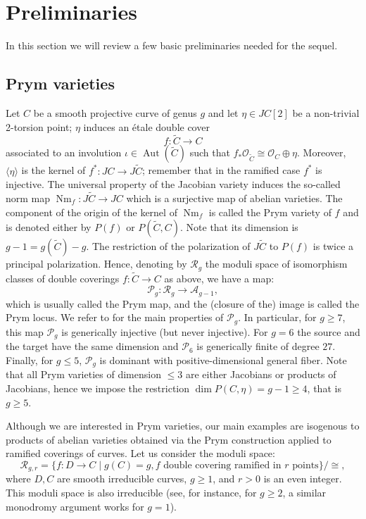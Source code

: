 \documentclass[preprint,12pt]{amsart}
\def\cA{\ensuremath{\mathcal{A}}}
\def\cP{\ensuremath{\mathcal{P}}}
\def\cR{\ensuremath{\mathcal{R}}}
\def\tC{\ensuremath{\tilde{C}}}
\DeclareMathOperator{\Aut}{Aut}
\DeclareMathOperator{\Nm}{Nm}
\theoremstyle{plain}
\theoremstyle{definition}
\begin{document}
\section{Preliminaries}
In this section we will review a few basic preliminaries needed for the sequel.

\subsection{Prym varieties}\label{subsec:PrymVar} Let $C$ be a smooth projective curve of genus $g$ and let $\eta\in JC[2]$ be a non-trivial 2-torsion point; $\eta$ induces an \'etale double cover 
\[f:\tC\to C\]
associated to an involution $\iota\in\Aut(\tC)$ such that $f_*\mathcal{O}_{\tC}\cong\mathcal{O}_C\oplus\eta.$ Moreover, $\langle \eta \rangle$ is the kernel of $f^* : JC \rightarrow J\tC $; remember that in the ramified case $f^*$ is injective.
The universal property of the Jacobian variety induces the so-called norm map $\Nm_f:J\tC \rightarrow JC$ which is a surjective map of abelian varieties.
The component of the origin of the kernel of $\Nm_f$ is called the Prym variety of $f$ and is denoted either by $P(f)$ or $P(\tC,C)$.
Note that its dimension is $g-1=g(\tC)-g$.
The restriction of the polarization of $J\tC$ to $P(f)$ is twice a principal polarization.
Hence, denoting by $\cR_g$ the moduli space of isomorphism classes of double coverings $f:\tC\rightarrow C$ as above, we have a map:
\[
\cP_g:\cR_g \to \cA_{g-1}, 
\]
which is usually called the Prym map, and the (closure of the) image is called the Prym locus.
We refer to \cite{do_fibres} for the main properties of $\cP_g$.
In particular, for $g\ge 7$, this map $\cP_g$ is generically injective (but never injective).
For $g=6$ the source and the target have the same dimension and $\cP_6$ is generically finite of degree $27$.
Finally, for $g\le 5$, $\cP_g$ is dominant with positive-dimensional general fiber.
Note that all Prym varieties of dimension $\le 3$ are either Jacobians or products of Jacobians, hence we impose the restriction $\dim P(C,\eta)=g-1\ge 4$, that is $g\ge 5$.

Although we are interested in Prym varieties, our main examples are isogenous to products of abelian varieties obtained via the Prym construction applied to ramified coverings of curves.
Let us consider the moduli space: 
\[
\cR_{g,r}=\{f:D\rightarrow C \mid g(C)=g, f \text{ double covering ramified in } r \text{ points} \}/\cong,
\]
where $D,C$ are smooth irreducible curves, $g\ge 1$, and $r>0$ is an even integer.
This moduli space is also irreducible (see, for instance, \cite[Proposition~2.5]{Bu} for $g\ge 2$, a similar monodromy argument works for $g=1$).
\end{document}
